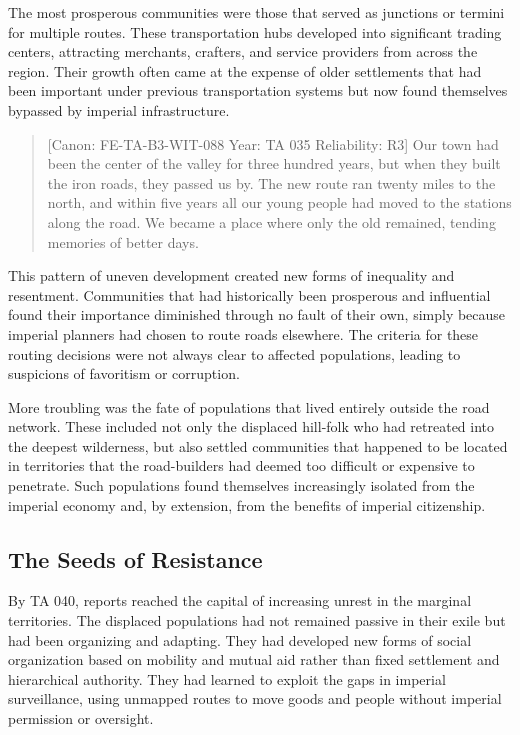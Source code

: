 The most prosperous communities were those that served as junctions or
termini for multiple routes. These transportation hubs developed into
significant trading centers, attracting merchants, crafters, and service
providers from across the region. Their growth often came at the expense
of older settlements that had been important under previous
transportation systems but now found themselves bypassed by imperial
infrastructure.

\begin{quote}
{[}Canon: FE-TA-B3-WIT-088 \textbar{} Year: TA 035 \textbar{}
Reliability: R3{]} Our town had been the center of the valley for three
hundred years, but when they built the iron roads, they passed us by.
The new route ran twenty miles to the north, and within five years all
our young people had moved to the stations along the road. We became a
place where only the old remained, tending memories of better days.
\end{quote}

This pattern of uneven development created new forms of inequality and
resentment. Communities that had historically been prosperous and
influential found their importance diminished through no fault of their
own, simply because imperial planners had chosen to route roads
elsewhere. The criteria for these routing decisions were not always
clear to affected populations, leading to suspicions of favoritism or
corruption.

More troubling was the fate of populations that lived entirely outside
the road network. These included not only the displaced hill-folk who
had retreated into the deepest wilderness, but also settled communities
that happened to be located in territories that the road-builders had
deemed too difficult or expensive to penetrate. Such populations found
themselves increasingly isolated from the imperial economy and, by
extension, from the benefits of imperial citizenship.

\subsection{The Seeds of Resistance}\label{the-seeds-of-resistance}

By TA 040, reports reached the capital of increasing unrest in the
marginal territories. The displaced populations had not remained passive
in their exile but had been organizing and adapting. They had developed
new forms of social organization based on mobility and mutual aid rather
than fixed settlement and hierarchical authority. They had learned to
exploit the gaps in imperial surveillance, using unmapped routes to move
goods and people without imperial permission or oversight.

